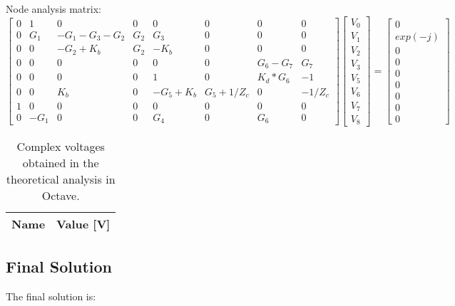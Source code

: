 Node analysis matrix:
\begin{equation}
\begin{bmatrix}
  0 & 1 & 0 & 0 & 0 & 0 & 0 & 0 \\
  0 & G_1 & -G_1-G_3-G_2 & G_2 & G_3 & 0 & 0 & 0\\
  0 & 0 & -G_2+K_b & G_2 & -K_b & 0 & 0 & 0 \\
  0 & 0 & 0 & 0 & 0 & 0 & G_6-G_7 & G_7 \\
  0 & 0 & 0 & 0 & 1 & 0 & K_d*G_6 & -1 \\
  0 & 0 & K_b & 0 & -G_5+K_b & G_5+1/Z_c & 0 & -1/Z_c \\
  1 & 0 & 0 & 0 & 0 & 0 & 0 & 0 \\
  0 & -G_1 & 0 & 0 & G_4 & 0 & G_6 & 0
\end{bmatrix}
\begin{bmatrix}
  V_0 \\ V_1 \\ V_2 \\ V_3 \\ V_5 \\ V_6 \\ V_7 \\ V_8 
\end{bmatrix}
=
\begin{bmatrix}
  0 \\ exp(-j) \\ 0 \\ 0 \\ 0 \\ 0 \\ 0 \\ 0 \\ 0
\end{bmatrix}
\end{equation}

\begin{table}[H]
  \centering
  \begin{tabular}{|l|r|}
    \hline    
    {\bf Name} & {\bf Value [V]} \\ \hline
	
  \end{tabular}
  \caption{Complex voltages obtained in the theoretical analysis in Octave.}
  \label{tab:octave_4}
\end{table}
\newpage
\subsection{Final Solution}

\tab The final solution is: 

